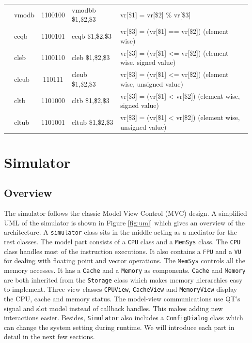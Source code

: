 \documentclass{sig-alternate}
\begin{document}
\begin{table}
\begin{tabular}{|c|l|c|l|p{8cm}|}
 & vmodb & 1100100 & vmodbb \$1,\$2,\$3 & vr[\$1] = vr[\$2] \% vr[\$3] \\ \cline{2-5}
 & ceqb & 1100101 & ceqb \$1,\$2,\$3 & vr[\$3] = (vr[\$1] == vr[\$2]) (element wise)\\ \cline{2-5}  
 & cleb & 1100110 & cleb \$1,\$2,\$3&vr[\$3] = (vr[\$1] <= vr[\$2]) (element wise, signed value)  \\ \cline{2-5}
 & cleub & 110111 & cleub \$1,\$2,\$3 & vr[\$3] = (vr[\$1] <= vr[\$2]) (element wise, unsigned value) \\ \cline{2-5}
 & cltb & 1101000 & cltb \$1,\$2,\$3 & vr[\$3] = (vr[\$1] < vr[\$2]) (element wise, signed value) \\ \cline{2-5}
 & cltub & 1101001 & cltub \$1,\$2,\$3 &vr[\$3] = (vr[\$1] < vr[\$2]) (element wise, unsigned value) \\ \hline
\end{tabular}
\end{table}


\section{Simulator}
\subsection{Overview}
The simulator follows the classic Model View Control (MVC) design. A simplified UML of the simulator is shown in Figure \ref{fig:uml} which gives an overview of the architecture. A \texttt{simulator} class sits in the middle acting as a mediator for the rest classes. The model part consists of a \texttt{CPU} class and a \texttt{MemSys} class. The \texttt{CPU} class handles most of the instruction executions. It also contains a \texttt{FPU} and a \texttt{VU} for dealing with floating point and vector operations. The \texttt{MemSys} controls all the memory accesses. It has a \texttt{Cache} and a \texttt{Memory} as components. \texttt{Cache} and \texttt{Memory} are both inherited from the \texttt{Storage} class which makes memory hierarchies easy to implement. Three view classes \texttt{CPUView}, \texttt{CacheView} and \texttt{MemoryView} display the CPU, cache and memory status. The model-view communications use QT's signal and slot model instead of callback handles. This makes adding new interactions easier. Besides, \texttt{Simulator} also includes a \texttt{ConfigDialog} class which can change the system setting during runtime. We will introduce each part in detail in the next few sections. 
\end{document}
